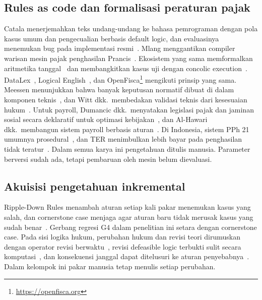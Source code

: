 \documentclass[conference]{IEEEtran}
\makeatletter
\DeclareRobustCommand{\en}[1]{{\usefont{\f@encoding}{\f@family}{\f@series}{it}#1\/}}
\makeatother
\begin{document}
\subsection{\en{Rules as code} dan formalisasi peraturan pajak}
Catala menerjemahkan teks undang-undang ke bahasa pemrograman dengan pola kasus umum dan pengecualian berbasis \en{default logic}, dan evaluasinya menemukan \en{bug} pada implementasi resmi~\cite{merigoux2021catala,huttner2022catala}. Mlang menggantikan \en{compiler} warisan mesin pajak penghasilan Prancis~\cite{merigoux2021mlang}. Ekosistem yang sama memformalkan aritmetika tanggal~\cite{monat2024date} dan membangkitkan kasus uji dengan \en{concolic execution}~\cite{goutagny2025cutecat}. DataLex~\cite{mowbray2023scaling,mowbray2023xai}, Logical English~\cite{kowalski2022logicalenglish}, dan OpenFisca\footnote{\url{https://openfisca.org}} mengikuti prinsip yang sama. Meessen menunjukkan bahwa banyak keputusan normatif dibuat di dalam komponen teknis~\cite{meessen2023arrows}, dan Witt dkk.\ membedakan validasi teknis dari kesesuaian hukum~\cite{witt2024encoding}. Untuk \en{payroll}, Dumancic dkk.\ menyatakan legislasi pajak dan jaminan sosial secara deklaratif untuk optimasi kebijakan~\cite{dumancic2021payroll}, dan Al-Hawari dkk.\ membangun sistem \en{payroll} berbasis aturan~\cite{alhawari2026payroll}. Di Indonesia, sistem PPh 21 umumnya prosedural~\cite{ramadhani2021grossup,yulistyawati2022payroll,kusuma2026pph21}, dan TER menimbulkan lebih bayar pada penghasilan tidak teratur~\cite{sherra2025ter}. Dalam semua karya ini pengetahuan ditulis manusia. Parameter berversi sudah ada, tetapi pembaruan oleh mesin belum dievaluasi.

\subsection{Akuisisi pengetahuan inkremental}
\en{Ripple-Down Rules} menambah aturan setiap kali pakar menemukan kasus yang salah, dan \en{cornerstone case} menjaga agar aturan baru tidak merusak kasus yang sudah benar~\cite{compton2021rdr}. Gerbang regresi G4 dalam penelitian ini setara dengan \en{cornerstone case}. Pada sisi logika hukum, perubahan hukum dan revisi teori dirumuskan dengan operator revisi berwaktu~\cite{moguillansky2024temporalised}, revisi \en{defeasible logic} terbukti sulit secara komputasi~\cite{olivieri2025revising}, dan konsekuensi janggal dapat ditelusuri ke aturan penyebabnya~\cite{fungwacharakorn2021debugging}. Dalam kelompok ini pakar manusia tetap menulis setiap perubahan.
\end{document}

